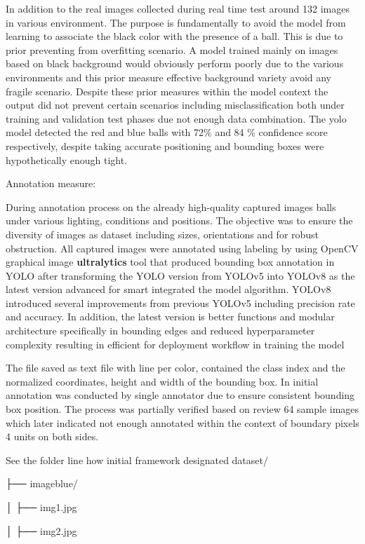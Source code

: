 In addition to the real images collected during real time test around 132 images in various environment. The purpose is fundamentally to avoid the model from learning to associate the black color with the presence of a ball. This is due to prior preventing from overfitting scenario. A model trained mainly on images based on black background would obviously perform poorly due to the various environments and this prior measure effective background variety avoid any fragile scenario. Despite these prior measures within the model context the output did not prevent certain scenarios including misclassification both under training and validation test phases due not enough data combination. The yolo model detected the red and blue balls with 72\% and 84 \% confidence score respectively, despite taking accurate positioning and bounding boxes were hypothetically enough tight.

Annotation measure:

During annotation process on the already high-quality captured images balls under various lighting, conditions and positions. The objective was to ensure the diversity of images as dataset including sizes, orientations and for robust obstruction. All captured images were annotated using labeling by using OpenCV graphical image \textbf{ultralytics} tool that produced bounding box annotation in YOLO after transforming the YOLO version from YOLOv5 into YOLOv8 as the latest version advanced  for smart integrated  the model algorithm. YOLOv8 introduced several improvements from previous YOLOv5 including precision rate and accuracy. In addition, the latest version is better functions and modular architecture specifically in bounding edges and reduced hyperparameter complexity resulting in efficient for deployment workflow in training the model

The file saved as text file with line per color, contained the class index and the normalized coordinates, height and width of the bounding box. In initial annotation was conducted by single annotator due to ensure consistent bounding box position. The process was partially verified based on review 64 sample images which later indicated not enough annotated within the context of boundary pixels 4 units on both sides. 

See the folder line how initial framework designated 
dataset/

 ├── imageblue/

 │ ├── img1.jpg

 │ ├── img2.jpg

